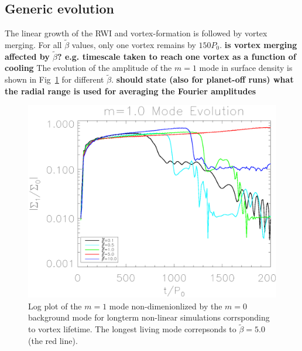 

\subsection{Generic evolution}

The linear growth of the RWI and vortex-formation is followed by 
vortex merging. For all $\tilde\beta$ values, only one vortex remains
by $150P_0$.
{\bf is vortex merging affected by $\tilde{\beta}$? e.g. timescale
  taken to reach one vortex as a function of cooling}
The evolution of the amplitude of the $m=1$ mode in surface density is
shown in Fig~\ref{lifetimeplot} for   
different $\tilde\beta$. {\bf should state (also for planet-off runs)
  what the radial range is used for averaging the Fourier amplitudes} 


\begin{figure}
  \includegraphics[width=\linewidth,clip=true,trim=0.5cm
    0cm 0cm 1cm]{figures/longterm_stability}
  \caption{Log plot of the $m=1$ mode non-dimenionlized by the $m=0$
    background mode for longterm non-linear simulations corrsponding
    to vortex lifetime. The longest living mode correpsonds to
    $\tilde\beta=5.0$ (the red line). \label{lifetimeplot}} 
\end{figure}

